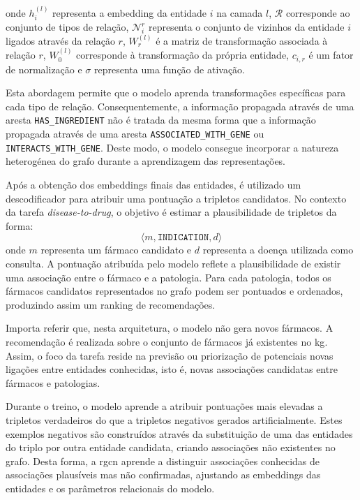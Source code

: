 onde \(h_i^{(l)}\) representa a embedding da entidade \(i\) na camada \(l\), \(\mathcal{R}\) corresponde ao conjunto de tipos de relação, \(\mathcal{N}_i^r\) representa o conjunto de vizinhos da entidade \(i\) ligados através da relação \(r\), \(W_r^{(l)}\) é a matriz de transformação associada à relação \(r\), \(W_0^{(l)}\) corresponde à transformação da própria entidade, \(c_{i,r}\) é um fator de normalização e \(\sigma\) representa uma função de ativação.

Esta abordagem permite que o modelo aprenda transformações específicas para cada tipo de relação. Consequentemente, a informação propagada através de uma aresta \texttt{HAS\_INGREDIENT} não é tratada da mesma forma que a informação propagada através de uma aresta \texttt{ASSOCIATED\_WITH\_GENE} ou \texttt{INTERACTS\_WITH\_GENE}. Deste modo, o modelo consegue incorporar a natureza heterogénea do grafo durante a aprendizagem das representações.

Após a obtenção dos embeddings finais das entidades, é utilizado um descodificador para atribuir uma pontuação a tripletos candidatos. No contexto da tarefa \emph{disease-to-drug}, o objetivo é estimar a plausibilidade de tripletos da forma:
\[\langle m, \texttt{INDICATION}, d \rangle\]
onde \(m\) representa um fármaco candidato e \(d\) representa a doença utilizada como consulta. A pontuação atribuída pelo modelo reflete a plausibilidade de existir uma associação entre o fármaco e a patologia. Para cada patologia, todos os fármacos candidatos representados no grafo podem ser pontuados e ordenados, produzindo assim um ranking de recomendações.

Importa referir que, nesta arquitetura, o modelo não gera novos fármacos. A recomendação é realizada sobre o conjunto de fármacos já existentes no \acrshort{kg}. Assim, o foco da tarefa reside na previsão ou priorização de potenciais novas ligações entre entidades conhecidas, isto é, novas associações candidatas entre fármacos e patologias.

Durante o treino, o modelo aprende a atribuir pontuações mais elevadas a tripletos verdadeiros do que a tripletos negativos gerados artificialmente. Estes exemplos negativos são construídos através da substituição de uma das entidades do triplo por outra entidade candidata, criando associações não existentes no grafo. Desta forma, a \acrshort{rgcn} aprende a distinguir associações conhecidas de associações plausíveis mas não confirmadas, ajustando as embeddings das entidades e os parâmetros relacionais do modelo.


